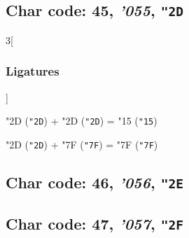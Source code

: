 \documentclass{article}
\newlength{\maxcharwidth}
\begin{document}
\subsection{Char code: 45, {\it'055}, {\tt"2D}}
\label{char_45}


\begin{multicols}{3}[\subsubsection{Ligatures}]

{\testfont\char"2D\noboundary} ({\tt"2D}) + {\testfont\char"2D\noboundary} ({\tt"2D}) = {\testfont\char"15\noboundary} ({\tt"15}) 

{\testfont\char"2D\noboundary} ({\tt"2D}) + {\testfont\char"7F\noboundary} ({\tt"7F}) = {\testfont\char"7F\noboundary} ({\tt"7F}) 

\end{multicols}

\subsection{Char code: 46, {\it'056}, {\tt"2E}}
\label{char_46}


\subsection{Char code: 47, {\it'057}, {\tt"2F}}
\label{char_47}

\end{document}
